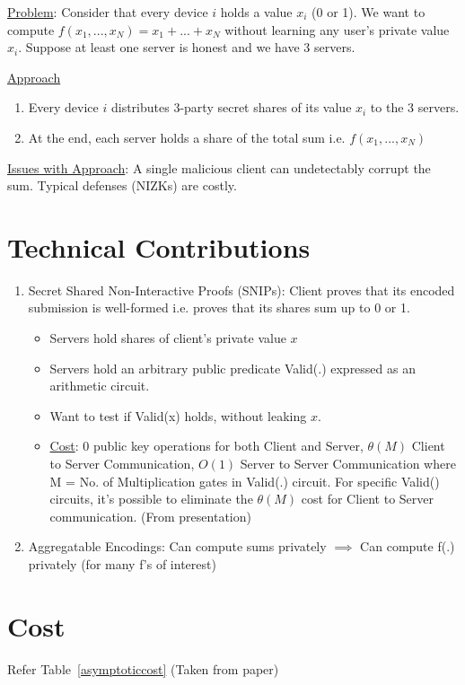 \underline{Problem}: Consider that every device $i$ holds a value $x_i$ (0 or 1). We want to compute $f(x_1, ..., x_N) = x_1 + ... + x_N$ without learning any user's private value $x_i$. Suppose at least one server is honest and we have 3 servers. 

\noindent \underline{Approach}
\begin{enumerate}
    \item Every device $i$ distributes 3-party secret shares of its value $x_i$ to the 3 servers.
    \item At the end, each server holds a share of the total sum i.e. $f(x_1, ..., x_N)$
\end{enumerate}

\noindent \underline{Issues with Approach}: A single malicious client can undetectably corrupt the sum. Typical defenses (NIZKs) are costly.

\section{Technical Contributions}
\begin{enumerate}
    \item Secret Shared Non-Interactive Proofs (SNIPs): Client proves that its encoded submission is well-formed i.e. proves that its shares sum up to 0 or 1.
    \begin{itemize}
        \item Servers hold shares of client's private value $x$
        \item Servers hold an arbitrary public predicate Valid(.) expressed as an arithmetic circuit.
        \item Want to test if Valid(x) holds, without leaking $x$.
        \item \underline{Cost}: 0 public key operations for both Client and Server, $\theta(M)$ Client to Server Communication, $O(1)$ Server to Server Communication where M = No. of Multiplication gates in Valid(.) circuit. For specific Valid() circuits, it's possible to eliminate the $\theta(M)$ cost for Client to Server communication. (From presentation)
    \end{itemize}
    \item Aggregatable Encodings: Can compute sums privately $\implies$ Can compute f(.) privately (for many f's of interest)
\end{enumerate}

\section{Cost}
Refer Table~\ref{asymptoticcost} (Taken from paper)

